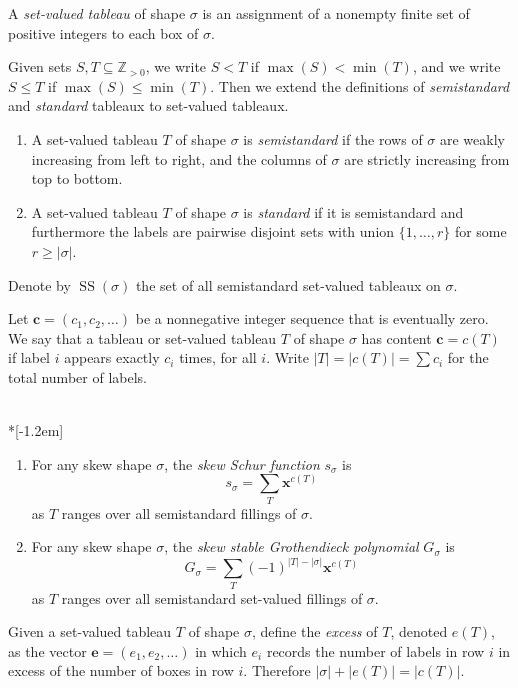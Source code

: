 \documentclass[ALCO,ThmDefs,Unicode,epreuves]{cedram}
\newcommand{\ZZ}{\mathbb{Z}}
\DeclareMathOperator{\Semi}{SS}
\newcommand{\bfc}{\mathbf{c}}
\newcommand{\bfe}{\mathbf{e}}
\begin{document}
\begin{defi} \label{def:svt}
A \emph{set-valued tableau} of shape $\sigma$ is an assignment of a nonempty finite set of positive integers to each box of $\sigma$. 

Given sets $S,T\subseteq \ZZ_{>0}$, we write $S<T$ if $\max(S)<\min(T)$, and we write $S\le T$ if $\max(S)\le\min(T)$. Then we extend the definitions of \emph{semistandard} and \emph{standard} tableaux to set-valued tableaux.
\begin{enumerate}
\item \label{it:sstd}A set-valued tableau $T$ of shape $\sigma$ is \emph{semistandard} if the rows of $\sigma$ are weakly increasing from left to right, and the columns of $\sigma$ are strictly increasing from top to bottom.
\item \label{it:std} A set-valued tableau $T$ of shape $\sigma$ is \emph{standard} if it is semistandard and furthermore the labels are pairwise disjoint sets with union $\{1,\ldots,r\}$ for some $r \ge |\sigma|$.
\end{enumerate}
Denote by $\Semi(\sigma)$ the set of all semistandard set-valued tableaux on $\sigma$.
\end{defi}


Let $\bfc=(c_1,c_2,\ldots)$ be a nonnegative integer sequence that is eventually zero. We say that a tableau or set-valued tableau $T$ of shape $\sigma$ has content $\bfc = c(T)$ if label $i$ appears exactly $c_i$ times, for all $i$. 
Write $|T| = |c(T)| = \sum c_i$ for the total number of labels.

\begin{defi} \label{def:schur-groth}\ \\*[-1.2em]
\begin{enumerate}
\item\label{defi2.4_1}
For any skew shape $\sigma$, the \emph{skew Schur function} $s_\sigma$ is
\[
s_\sigma =\sum_T {\mathbf{x}}^{c(T)}
\]
as $T$ ranges over all semistandard fillings of $\sigma.$
\item\label{defi2.4_2}
For any skew shape $\sigma$, the \emph{skew stable Grothendieck polynomial} $G_\sigma$ is
\[
G_\sigma =\sum_T (-1)^{|T|-|\sigma|}{\mathbf{x}}^{c(T)}
\]
as $T$ ranges over all semistandard set-valued fillings of $\sigma.$
\end{enumerate}
\end{defi}

Given a set-valued tableau $T$ of shape $\sigma$, define the \emph{excess} of $T$, denoted $e(T)$, as the vector $\bfe = (e_1,e_2,\ldots)$ in which $e_i$ records the number of labels in row $i$ in excess of the number of boxes in row $i$. Therefore $|\sigma|+|e(T)|=|c(T)|$. 
\end{document}
